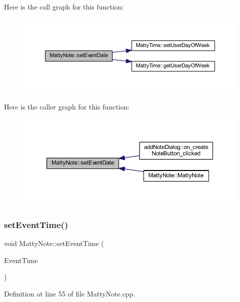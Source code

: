 Here is the call graph for this function\+:
\nopagebreak
\begin{figure}[H]
\begin{center}
\leavevmode
\includegraphics[width=350pt]{classMattyNote_a70676b1ab215b873c9451a82cc417684_cgraph}
\end{center}
\end{figure}
Here is the caller graph for this function\+:
\nopagebreak
\begin{figure}[H]
\begin{center}
\leavevmode
\includegraphics[width=350pt]{classMattyNote_a70676b1ab215b873c9451a82cc417684_icgraph}
\end{center}
\end{figure}
\hypertarget{classMattyNote_aaeba8670420ab9ad0fb8be660845e0ba}{}\label{classMattyNote_aaeba8670420ab9ad0fb8be660845e0ba} 
\subsubsection{\texorpdfstring{set\+Event\+Time()}{setEventTime()}}
{\footnotesize\ttfamily void Matty\+Note\+::set\+Event\+Time (\begin{DoxyParamCaption}\item[{const Q\+String \&}]{Event\+Time }\end{DoxyParamCaption})}



Definition at line 55 of file Matty\+Note.\+cpp.

